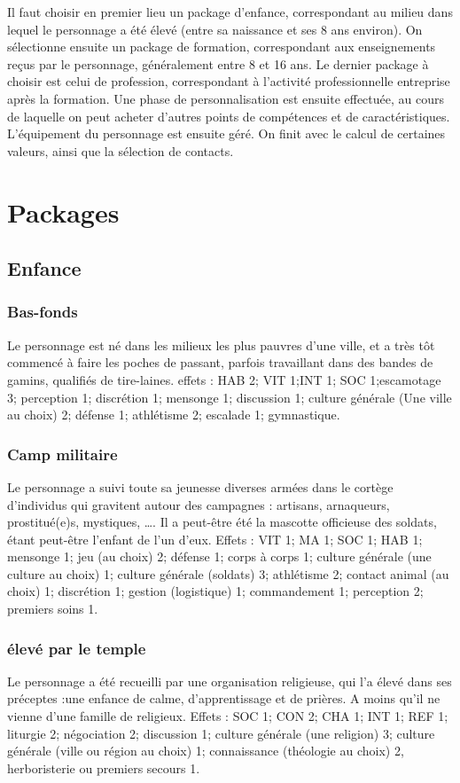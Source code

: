 \documentclass[10pt,a4paper,twocolumn]{book}
\begin{document}
Il faut choisir en premier lieu un package d’enfance, correspondant au milieu dans lequel le personnage a été élevé (entre sa naissance et ses 8 ans environ).
On sélectionne ensuite un package de formation, correspondant aux enseignements reçus par le personnage, généralement entre 8 et 16 ans.
Le dernier package à choisir est celui de profession, correspondant à l’activité professionnelle entreprise après la formation.
Une phase de personnalisation est ensuite effectuée, au cours de laquelle on peut acheter d’autres points de compétences et de caractéristiques.
L’équipement du personnage est ensuite géré.
On finit avec le calcul de certaines valeurs, ainsi que la sélection de contacts.
\section{Packages}
\subsection{Enfance}
\subsubsection{Bas-fonds}
Le personnage est né dans les milieux les plus pauvres d’une ville, et a très tôt commencé à faire les poches de passant, parfois travaillant dans des bandes de gamins, qualifiés de tire-laines.
effets : HAB 2; VIT 1;INT 1; SOC 1;escamotage 3; perception 1; discrétion 1; mensonge 1; discussion 1; culture générale (Une ville au choix) 2; défense 1; athlétisme 2; escalade 1; gymnastique.
\subsubsection{Camp militaire}
Le personnage a suivi toute sa jeunesse diverses armées dans le cortège d’individus qui gravitent autour des campagnes : artisans, arnaqueurs, prostitué(e)s, mystiques, …. Il a peut-être été la mascotte officieuse des soldats, étant peut-être l’enfant de l’un d’eux.
Effets : VIT 1; MA 1; SOC 1; HAB 1; mensonge 1; jeu (au choix) 2; défense 1; corps à corps 1; culture générale (une culture au choix) 1; culture générale (soldats) 3;  athlétisme 2; contact animal (au choix) 1; discrétion 1; gestion (logistique) 1; commandement 1; perception 2; premiers soins 1.
\subsubsection{élevé par le temple}
Le personnage a été recueilli par une organisation religieuse, qui l’a élevé dans ses préceptes :une enfance de calme, d’apprentissage et de prières. A moins qu’il ne vienne d’une famille de religieux.
Effets : SOC 1; CON 2; CHA 1; INT 1; REF 1; liturgie 2; négociation 2; discussion 1; culture générale (une religion) 3; culture générale (ville ou région au choix) 1; connaissance (théologie au choix) 2, herboristerie ou premiers secours 1.
\end{document}
